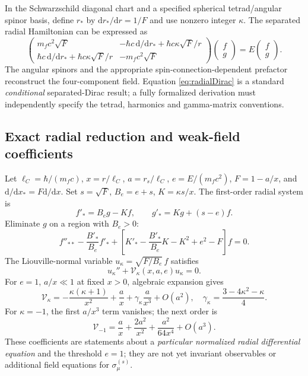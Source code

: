 \documentclass[11pt,a4paper,oneside]{report}
\numberwithin{equation}{chapter}
\theoremstyle{definition}\newtheorem{definition}[theorem]{Definition}
\theoremstyle{remark}\newtheorem{remark}[theorem]{Remark}
\newcommand{\dd}{\mathrm d}
\begin{document}
In the Schwarzschild diagonal chart and a specified spherical tetrad/angular spinor basis, define $r_*$ by $\dd r_*/\dd r=1/F$ and use nonzero integer $\kappa$. The separated radial Hamiltonian can be expressed as
\begin{equation}
 \boxed{\begin{pmatrix}
 m_fc^2\sqrt F&-\hbar c\,\dd/\dd r_*+\hbar c\kappa\sqrt F/r\\
 \hbar c\,\dd/\dd r_*+\hbar c\kappa\sqrt F/r&-m_fc^2\sqrt F
 \end{pmatrix}\begin{pmatrix}f\\g\end{pmatrix}
 =E\begin{pmatrix}f\\g\end{pmatrix}.}
 \label{eq:radialDirac}
\end{equation}
The angular spinors and the appropriate spin-connection-dependent prefactor reconstruct the four-component field. Equation \eqref{eq:radialDirac} is a standard \emph{conditional} separated-Dirac result; a fully formalized derivation must independently specify the tetrad, harmonics and gamma-matrix conventions.

\subsection{Exact radial reduction and weak-field coefficients}
Let $\ell_C=\hbar/(m_fc)$, $x=r/\ell_C$, $a=r_s/\ell_C$, $e=E/(m_fc^2)$, $F=1-a/x$, and $\dd/\dd x_*=F\dd/\dd x$. Set $s=\sqrt F$, $B_e=e+s$, $K=\kappa s/x$. The first-order radial system is
\begin{equation}
 f'_* =B_e g-Kf,\qquad g'_* =Kg+(s-e)f.
 \label{eq:radialFirst}
\end{equation}
Eliminate $g$ on a region with $B_e>0$:
\begin{equation}
 f''_{**}-\frac{B'_*}{B_e}f'_*
 +\left[K'_* -\frac{B'_*}{B_e}K-K^2+e^2-F\right]f=0.
 \label{eq:felim}
\end{equation}
The Liouville-normal variable $u_\kappa=\sqrt{F/B_e}\,f$ satisfies
\begin{equation}
 u_\kappa''+\mathcal V_\kappa(x,a,e)u_\kappa=0.
 \label{eq:liouville}
\end{equation}
For $e=1$, $a/x\ll1$ at fixed $x>0$, algebraic expansion gives
\begin{equation}
 \boxed{\displaystyle
 \mathcal V_\kappa=-\frac{\kappa(\kappa+1)}{x^2}
 +\frac ax+\gamma_\kappa\frac a{x^3}+O(a^2),
 \quad\gamma_\kappa=\frac{3-4\kappa^2-\kappa}{4}.}
 \label{eq:Vone}
\end{equation}
For $\kappa=-1$, the first $a/x^3$ term vanishes; the next order is
\begin{equation}
 \boxed{\displaystyle
 \mathcal V_{-1}=\frac ax+\frac{2a^2}{x^2}
 +\frac{a^2}{64x^4}+O(a^3).}
 \label{eq:Vtwo}
\end{equation}
These coefficients are statements about a \emph{particular normalized radial differential equation} and the threshold $e=1$; they are not yet invariant observables or additional field equations for $\sigma_\mu^{(s)}$.
\end{document}
